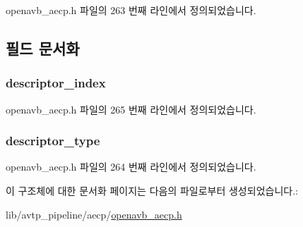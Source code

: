 openavb\+\_\+aecp.\+h 파일의 263 번째 라인에서 정의되었습니다.



\subsection{필드 문서화}
\subsubsection[{\texorpdfstring{descriptor\+\_\+index}{descriptor_index}}]{ descriptor\+\_\+index}\hypertarget{structopenavb__aecp__command__data__get__control__t_ab26fb363c24b9a2a4391f9171c981b08}{}\label{structopenavb__aecp__command__data__get__control__t_ab26fb363c24b9a2a4391f9171c981b08}


openavb\+\_\+aecp.\+h 파일의 265 번째 라인에서 정의되었습니다.

\subsubsection[{\texorpdfstring{descriptor\+\_\+type}{descriptor_type}}]{ descriptor\+\_\+type}\hypertarget{structopenavb__aecp__command__data__get__control__t_a1e231d7874aada5925b29affc76782cc}{}\label{structopenavb__aecp__command__data__get__control__t_a1e231d7874aada5925b29affc76782cc}


openavb\+\_\+aecp.\+h 파일의 264 번째 라인에서 정의되었습니다.



이 구조체에 대한 문서화 페이지는 다음의 파일로부터 생성되었습니다.\+:\begin{DoxyCompactItemize}
\item 
lib/avtp\+\_\+pipeline/aecp/\hyperlink{openavb__aecp_8h}{openavb\+\_\+aecp.\+h}\end{DoxyCompactItemize}
